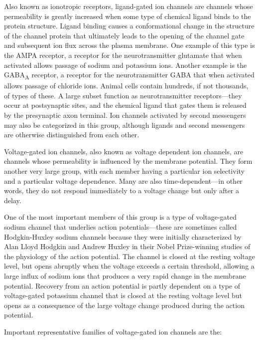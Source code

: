 \documentclass[]{book}
\begin{document}
Also known as ionotropic receptors, ligand-gated ion channels are channels whose permeability is greatly increased when some type of chemical ligand binds to the protein structure. Ligand binding causes a conformational change in the structure of the channel protein that ultimately leads to the opening of the channel gate and subsequent ion flux across the plasma membrane. One example of this type is the AMPA receptor, a receptor for the neurotransmitter glutamate that when activated allows passage of sodium and potassium ions. Another example is the GABA\textsubscript{A} receptor, a receptor for the neurotransmitter GABA that when activated allows passage of chloride ions. Animal cells contain hundreds, if not thousands, of types of these. A large subset function as neurotransmitter receptors---they occur at postsynaptic sites, and the chemical ligand that gates them is released by the presynaptic axon terminal. Ion channels activated by second messengers may also be categorized in this group, although ligands and second messengers are otherwise distinguished from each other.

Voltage-gated ion channels, also known as voltage dependent ion channels, are channels whose permeability is influenced by the membrane potential. They form another very large group, with each member having a particular ion selectivity and a particular voltage dependence. Many are also time-dependent---in other words, they do not respond immediately to a voltage change but only after a delay.

One of the most important members of this group is a type of voltage-gated sodium channel that underlies action potentials---these are sometimes called Hodgkin-Huxley sodium channels because they were initially characterized by Alan Lloyd Hodgkin and Andrew Huxley in their Nobel Prize-winning studies of the physiology of the action potential. The channel is closed at the resting voltage level, but opens abruptly when the voltage exceeds a certain threshold, allowing a large influx of sodium ions that produces a very rapid change in the membrane potential. Recovery from an action potential is partly dependent on a type of voltage-gated potassium channel that is closed at the resting voltage level but opens as a consequence of the large voltage change produced during the action potential.

Important representative families of voltage-gated ion channels are the:
\end{document}
